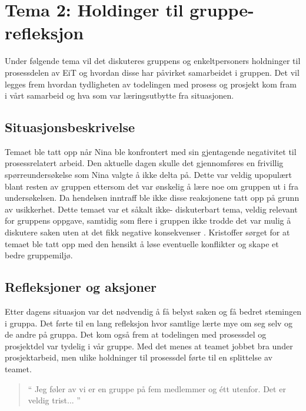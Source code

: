 \chapter{Tema 2: Holdinger til gruppe{-}\\refleksjon}

Under følgende tema vil det diskuteres gruppens og enkeltpersoners holdninger til prosessdelen av EiT og hvordan
disse har påvirket samarbeidet i gruppen. Det vil legges frem hvordan tydligheten av todelingen med prosess og 
prosjekt kom fram i vårt samarbeid og hva som var læringsutbytte fra situasjonen. 

\section{Situasjonsbeskrivelse}

Temaet ble tatt opp når Nina ble konfrontert med sin gjentagende negativitet til prosessrelatert arbeid. Den aktuelle 
dagen skulle det gjennomføres en frivillig spørreundersøkelse som Nina valgte å ikke delta på. Dette var veldig upopulært
blant resten av gruppen ettersom det var ønskelig å lære noe om gruppen ut i fra undersøkelsen. Da hendelsen inntraff 
ble ikke disse reaksjonene tatt opp på grunn av usikkerhet. Dette temaet var et  såkalt ikke- diskuterbart tema, veldig relevant for gruppens oppgave, samtidig som flere i gruppen ikke trodde det var mulig å diskutere saken uten at det fikk negative konsekvenser \cite{Artikkel3}. Kristoffer sørget for at temaet ble tatt opp med den hensikt å løse eventuelle
konflikter og skape et bedre gruppemiljø.

\section{Refleksjoner og aksjoner}

Etter dagens situasjon var det nødvendig å få belyst saken og få bedret stemingen i gruppa. Det førte til en lang
refleksjon hvor samtlige lærte mye om seg selv og de andre på gruppa. Det kom også frem at todelingen med prosessdel
og prosjektdel var tydelig i vår gruppe. Med det menes at teamet jobbet bra under prosjektarbeid, men ulike holdninger
til prosessdel førte til en splittelse av teamet. 

\begin{quote}``
Jeg føler av vi er en gruppe på fem medlemmer og étt utenfor. Det er veldig trist...
''\end{quote} 

